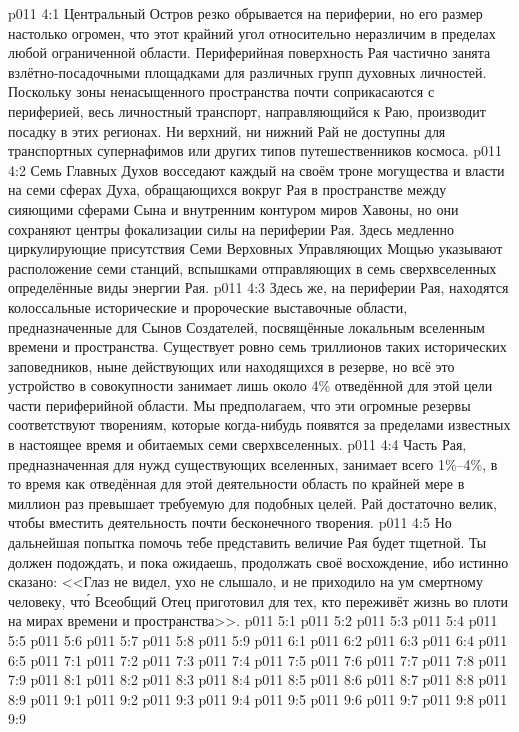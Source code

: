\vs p011 4:1 Центральный Остров резко обрывается на периферии, но его размер настолько огромен, что этот крайний угол относительно неразличим в пределах любой ограниченной области. Периферийная поверхность Рая частично занята взлётно\hyp{}посадочными площадками для различных групп духовных личностей. Поскольку зоны ненасыщенного пространства почти соприкасаются с периферией, весь личностный транспорт, направляющийся к Раю, производит посадку в этих регионах. Ни верхний, ни нижний Рай не доступны для транспортных супернафимов или других типов путешественников космоса.
\vs p011 4:2 Семь Главных Духов восседают каждый на своём троне могущества и власти на семи сферах Духа, обращающихся вокруг Рая в пространстве между сияющими сферами Сына и внутренним контуром миров Хавоны, но они сохраняют центры фокализации силы на периферии Рая. Здесь медленно циркулирующие присутствия Семи Верховных Управляющих Мощью указывают расположение семи станций, вспышками отправляющих в семь сверхвселенных определённые виды энергии Рая.
\vs p011 4:3 Здесь же, на периферии Рая, находятся колоссальные исторические и пророческие выставочные области, предназначенные для Сынов Создателей, посвящённые локальным вселенным времени и пространства. Существует ровно семь триллионов таких исторических заповедников, ныне действующих или находящихся в резерве, но всё это устройство в совокупности занимает лишь около 4\% отведённой для этой цели части периферийной области. Мы предполагаем, что эти огромные резервы соответствуют творениям, которые когда\hyp{}нибудь появятся за пределами известных в настоящее время и обитаемых семи сверхвселенных.
\vs p011 4:4 Часть Рая, предназначенная для нужд существующих вселенных, занимает всего 1\%--4\%, в то время как отведённая для этой деятельности область по крайней мере в миллион раз превышает требуемую для подобных целей. Рай достаточно велик, чтобы вместить деятельность почти бесконечного творения.
\vs p011 4:5 Но дальнейшая попытка помочь тебе представить величие Рая будет тщетной. Ты должен подождать, и пока ожидаешь, продолжать своё восхождение, ибо истинно сказано: <<Глаз не видел, ухо не слышало, и не приходило на ум смертному человеку, чт\'о Всеобщий Отец приготовил для тех, кто переживёт жизнь во плоти на мирах времени и пространства>>.
\vs p011 5:1 
\vs p011 5:2 
\vs p011 5:3 
\vs p011 5:4 
\vs p011 5:5 \pc 
\vs p011 5:6 \pc 
\vs p011 5:7 \pc 
\vs p011 5:8 
\vs p011 5:9 \pc 
{}
\vs p011 6:1 
\vs p011 6:2 
\vs p011 6:3 \pc 
\vs p011 6:4 \pc 
\vs p011 6:5 
\vs p011 7:1 
\vs p011 7:2 
\vs p011 7:3 
\vs p011 7:4 \pc 
\vs p011 7:5 
\vs p011 7:6 
\vs p011 7:7 \pc 
\vs p011 7:8 
\vs p011 7:9 
\vs p011 8:1 
\vs p011 8:2 
\vs p011 8:3 
\vs p011 8:4 \pc 
\vs p011 8:5 
\vs p011 8:6 
\vs p011 8:7 
\vs p011 8:8 \pc 
\vs p011 8:9 
\vs p011 9:1 
\vs p011 9:2 \pc 
\vs p011 9:3 \pc 
\vs p011 9:4 
\vs p011 9:5 \pc 
\vs p011 9:6 \pc 
\vs p011 9:7 
\vs p011 9:8 \pc 
\vsetoff
\vs p011 9:9 
\quizlink
